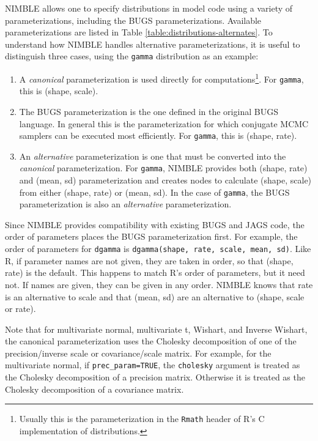 \documentclass[12pt,oneside]{book}\usepackage[]{graphicx}\usepackage[]{color}
\def\cd#1{\texttt{#1}}
\def\nm#1{\textit{#1}}
\begin{document}
NIMBLE allows one to specify distributions in model code using a
variety of parameterizations, including the BUGS
parameterizations. Available parameterizations are listed in Table \ref{table:distributions-alternates}.
To understand how NIMBLE handles alternative parameterizations, it is
useful to distinguish three cases, using the \cd{gamma} distribution
as an example:
\begin{enumerate}
\item A \nm{canonical} parameterization is used directly for
  computations\footnote{Usually this is the parameterization in the
  \cd{Rmath} header of R's C implementation of distributions.}.  For
  \cd{gamma}, this is (shape, scale).  
\item The BUGS parameterization is the one defined in the
  original BUGS language. In general this is the parameterization for which conjugate MCMC samplers can be executed most efficiently. For \cd{gamma}, this is (shape, rate). 
\item An \nm{alternative} parameterization is one that must be
  converted into the \nm{canonical} parameterization.  For \cd{gamma},
  NIMBLE provides both (shape, rate) and (mean, sd) parameterization
  and creates nodes to calculate (shape, scale) from either (shape,
  rate) or (mean, sd).  In the case of \cd{gamma}, the BUGS
  parameterization is also an \nm{alternative} parameterization.

\end{enumerate}

Since NIMBLE provides compatibility with existing BUGS and JAGS
code, the order of parameters places the BUGS parameterization
first.  For example, the order of parameters for \cd{dgamma} is \cd{dgamma(shape, rate, scale, mean, sd)}.  Like R, if
parameter names are not given, they are taken in order, so that (shape,
rate) is the default. This happens to  match R's order of parameters,
but it need not.  If names are given, they can be given in any
order.  NIMBLE knows that rate is an alternative to scale and that
(mean, sd) are an alternative to (shape, scale or rate). 



Note that for multivariate normal, multivariate t, Wishart, and Inverse Wishart, the canonical
parameterization uses the Cholesky decomposition of one of the
precision/inverse scale or covariance/scale matrix. For example, for the multivariate normal, if  \cd{prec\_param=TRUE}, the \cd{cholesky} argument is treated as the Cholesky
decomposition of a precision matrix.  Otherwise it is treated as the
Cholesky decomposition of a covariance matrix. 
\end{document}
